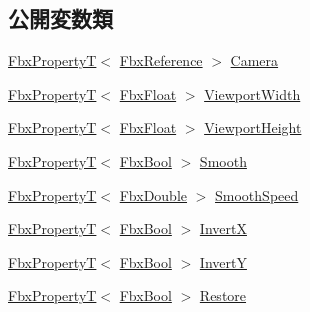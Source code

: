 \subsection*{公開変数類}
\begin{DoxyCompactItemize}
\item 
\hyperlink{class_fbx_property_t}{Fbx\+PropertyT}$<$ \hyperlink{fbxtypes_8h_a44df6a2eec915cf27cd481e5c5e48a24}{Fbx\+Reference} $>$ \hyperlink{class_fbx_camera_manipulator_a3914094466ec766c18c0e544431e8060}{Camera}
\item 
\hyperlink{class_fbx_property_t}{Fbx\+PropertyT}$<$ \hyperlink{fbxtypes_8h_aef968e37f2ddc4188de464d8578c1d5c}{Fbx\+Float} $>$ \hyperlink{class_fbx_camera_manipulator_a03e2795ba49c8bcce02dc786356ab2d5}{Viewport\+Width}
\item 
\hyperlink{class_fbx_property_t}{Fbx\+PropertyT}$<$ \hyperlink{fbxtypes_8h_aef968e37f2ddc4188de464d8578c1d5c}{Fbx\+Float} $>$ \hyperlink{class_fbx_camera_manipulator_afdf345d7e5f01d42da8011bbeb8dc394}{Viewport\+Height}
\item 
\hyperlink{class_fbx_property_t}{Fbx\+PropertyT}$<$ \hyperlink{fbxtypes_8h_a92e0562b2fe33e76a242f498b362262e}{Fbx\+Bool} $>$ \hyperlink{class_fbx_camera_manipulator_abdefaf7c5fef50e2c873616099c2a579}{Smooth}
\item 
\hyperlink{class_fbx_property_t}{Fbx\+PropertyT}$<$ \hyperlink{fbxtypes_8h_a171e72a1c46fc15c1a6c9c31948c1c5b}{Fbx\+Double} $>$ \hyperlink{class_fbx_camera_manipulator_afa0edcbcd8ad9a4de15672c7e8fc0c3d}{Smooth\+Speed}
\item 
\hyperlink{class_fbx_property_t}{Fbx\+PropertyT}$<$ \hyperlink{fbxtypes_8h_a92e0562b2fe33e76a242f498b362262e}{Fbx\+Bool} $>$ \hyperlink{class_fbx_camera_manipulator_aebb2e55534a051995499d73cd1742511}{InvertX}
\item 
\hyperlink{class_fbx_property_t}{Fbx\+PropertyT}$<$ \hyperlink{fbxtypes_8h_a92e0562b2fe33e76a242f498b362262e}{Fbx\+Bool} $>$ \hyperlink{class_fbx_camera_manipulator_a9e9a2e653b6ef9f1d3da31110f26fec3}{InvertY}
\item 
\hyperlink{class_fbx_property_t}{Fbx\+PropertyT}$<$ \hyperlink{fbxtypes_8h_a92e0562b2fe33e76a242f498b362262e}{Fbx\+Bool} $>$ \hyperlink{class_fbx_camera_manipulator_aafe0b0e43ecaf16a44a49ae2d55f440a}{Restore}
\end{DoxyCompactItemize}
